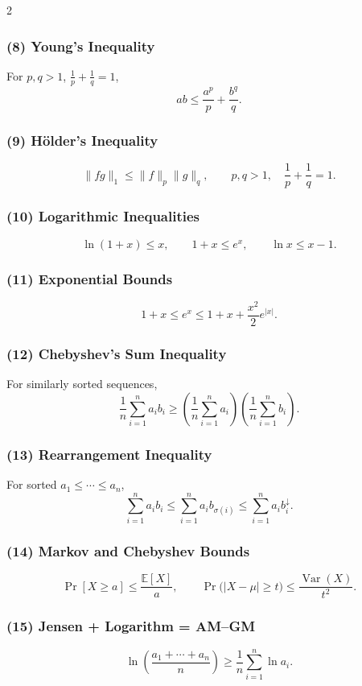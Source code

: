 \documentclass[8pt]{extarticle}
\theoremstyle{definition}
\begin{document}
\begin{multicols*}{2}
\subsubsection*{(8) Young's Inequality}
For \(p,q>1\), \(\tfrac{1}{p}+\tfrac{1}{q}=1\),
\[
ab \le \frac{a^p}{p} + \frac{b^q}{q}.
\]

\subsubsection*{(9) Hölder's Inequality}
\[
\|fg\|_1 \le \|f\|_p \|g\|_q,
\qquad
p,q>1,\quad \frac{1}{p}+\frac{1}{q}=1.
\]

\subsubsection*{(10) Logarithmic Inequalities}
\[
\ln(1+x)\le x,\qquad
1+x \le e^x,\qquad
\ln x \le x-1.
\]

\subsubsection*{(11) Exponential Bounds}
\[
1+x \le e^x \le 1 + x + \frac{x^2}{2}e^{|x|}.
\]

\subsubsection*{(12) Chebyshev's Sum Inequality}
For similarly sorted sequences,
\[
\frac{1}{n}\sum_{i=1}^n a_i b_i
\ge
\left(\frac{1}{n}\sum_{i=1}^n a_i\right)
\left(\frac{1}{n}\sum_{i=1}^n b_i\right).
\]

\subsubsection*{(13) Rearrangement Inequality}
For sorted \(a_1 \le \cdots \le a_n\),
\[
\sum_{i=1}^n a_i b_i
\le
\sum_{i=1}^n a_i b_{\sigma(i)}
\le
\sum_{i=1}^n a_i b_i^{\downarrow}.
\]

\subsubsection*{(14) Markov and Chebyshev Bounds}
\[
\Pr[X\ge a] \le \frac{\mathbb{E}[X]}{a},
\qquad
\Pr\big(|X-\mu|\ge t\big)\le \frac{\operatorname{Var}(X)}{t^2}.
\]

\subsubsection*{(15) Jensen + Logarithm = AM--GM}
\[
\ln\!\left(\frac{a_1+\cdots+a_n}{n}\right)
\ge
\frac{1}{n}\sum_{i=1}^n \ln a_i.
\]


\end{multicols*}
\end{document}
